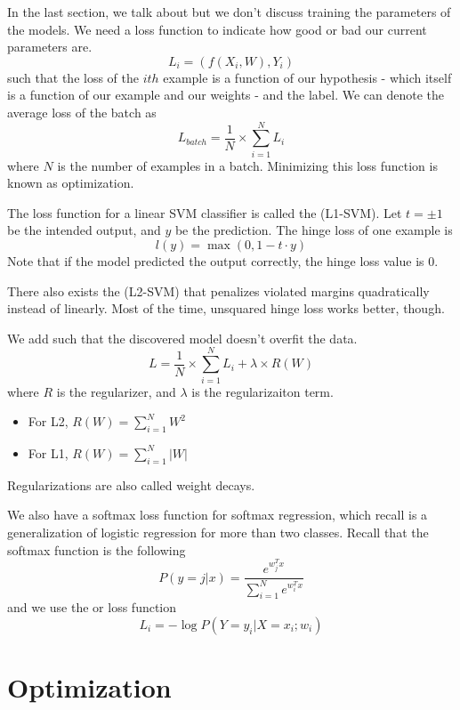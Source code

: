 \documentclass[12pt]{scrartcl}
\begin{document}
In the last section, we talk about  but we don't discuss
training the parameters of the models. We need a loss function to indicate how 
good or bad our current parameters are.
\[L_i = (f(X_i, W), Y_i)\]
such that the loss of the $ith$ example is a function of our hypothesis - which
itself is a function of our example and our weights - and the label. We can denote the 
average loss of the batch as 
\[L_{batch} = \frac{1}{N} \times \sum_{i=1}^N L_i\]
where $N$ is the number of examples in a batch. 
Minimizing this loss function is known as optimization.
\begin{definition}
  The loss function for a linear SVM classifier is called the  (L1-SVM).
  Let $t = \pm 1$ be the intended output, and $y$ be the prediction. The hinge loss
  of one example is 
  \[l(y) = \max(0, 1 - t \cdot y)\]
  Note that if the model predicted the output correctly, the hinge loss value is 0.
\end{definition}
There also exists the  (L2-SVM) that penalizes violated margins
quadratically instead of linearly. Most of the time, unsquared hinge loss works better,
though.

\begin{definition}
  We add  such that the discovered model doesn't overfit the data.
  \[L = \frac{1}{N}\times \sum_{i=1}^N L_i + \lambda \times R(W)\]
  where $R$ is the regularizer, and $\lambda$ is the regularizaiton term.
  \begin{itemize}
    \item For L2, $R(W) = \sum_{i=1}^N W^2$
    \item For L1, $R(W) = \sum_{i=1}^N |W|$
  \end{itemize}

  Regularizations are also called weight decays.
\end{definition}

\begin{definition}
  We also have a softmax loss function for softmax regression, which recall is a generalization
  of logistic regression for more than two classes. Recall that the softmax function
  is the following
  \[P(y = j | x) = \frac{e^{w_j^T x}}{\sum_{i=1}^N e^{w_i^T x}}\]
  and we use the  or  loss function
  \[L_i = -\log P(Y = y_i | X = x_i; w_i)\]
\end{definition}

\section{Optimization}
\end{document}
